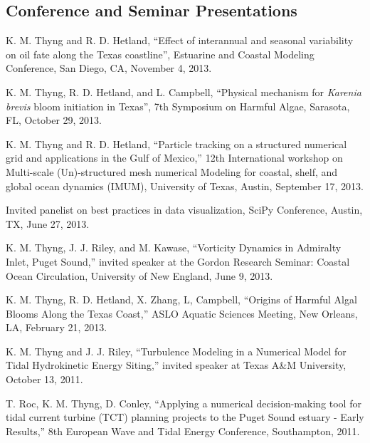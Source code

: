 \documentclass[10pt,letterpaper]{article}
\renewenvironment{itemize}{
  \begin{list}{}{
    \setlength{\leftmargin}{1.5em}
    \setlength{\itemsep}{0.25em}
    \setlength{\parskip}{0pt}
    \setlength{\parsep}{0.25em}
  }
}{
  \end{list}
}
\begin{document}
\subsection*{Conference and Seminar Presentations}

\begin{itemize}

\item K. M. Thyng and R. D. Hetland, ``Effect of interannual and seasonal variability on oil fate along the Texas coastline'', Estuarine and Coastal Modeling Conference, San Diego, CA, November 4, 2013.

\item K. M. Thyng, R. D. Hetland, and L. Campbell, ``Physical mechanism for \textit{Karenia brevis} bloom initiation in Texas'', 7th Symposium on Harmful Algae, Sarasota, FL, October 29, 2013.

\item K. M. Thyng and R. D. Hetland, ``Particle tracking on a structured numerical grid and applications in the Gulf of Mexico,'' 12th International workshop on Multi-scale (Un)-structured mesh numerical Modeling for coastal, shelf, and global ocean dynamics (IMUM), University of Texas, Austin, September 17, 2013.

\item Invited panelist on best practices in data visualization, SciPy Conference, Austin, TX, June 27, 2013.

\item K. M. Thyng, J. J. Riley, and M. Kawase, ``Vorticity Dynamics in Admiralty Inlet, Puget Sound,'' invited speaker at the Gordon Research Seminar: Coastal Ocean Circulation, University of New England, June 9, 2013.

\item K. M. Thyng, R. D. Hetland, X. Zhang, L, Campbell, ``Origins of Harmful Algal Blooms Along the Texas Coast,'' ASLO Aquatic Sciences Meeting, New Orleans, LA, February 21, 2013.

\item K. M. Thyng and J. J. Riley, ``Turbulence Modeling in a Numerical Model for Tidal Hydrokinetic Energy Siting,'' invited speaker at Texas A\&M University, October 13, 2011.

\item T. Roc, K. M. Thyng, D. Conley, ``Applying a numerical decision-making tool for tidal current turbine (TCT) planning projects to the Puget Sound estuary - Early Results,'' 8th European Wave and Tidal Energy Conference, Southampton, 2011.


\end{itemize}
\end{document}
